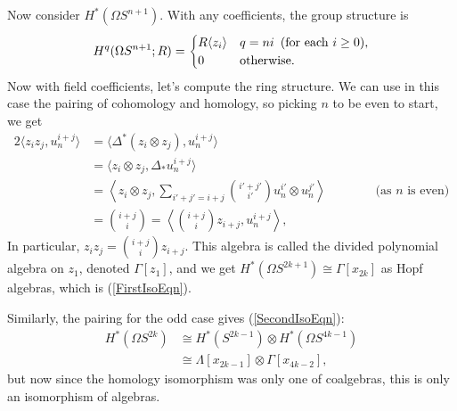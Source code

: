 \documentclass{article}
\newcommand{\Loops}{\Omega}
\begin{document}
Now consider $H^* (\Loops S^{n+1})$.  With any coefficients, the group structure is
\[
H^q(\Loops S^{n+1}; R) = \begin{cases} R \langle z_i \rangle & q=ni\textup{ \,(for each $i\geq0$)}, \\ 0 & \mathrm{otherwise}. \end{cases}
\]
Now with field coefficients, let's compute the ring structure.  We can use in this case the pairing of cohomology and homology, so picking $n$ to be even to start, we get
\begin{alignat*}{2}
\langle z_i z_j, u_n^{i+j} \rangle & = \langle \Delta^*(z_i \otimes z_j), u_n^{i+j} \rangle&\qquad& \\
& = \langle z_i \otimes z_j, \Delta_* u_n^{i+j} \rangle \\
& = \left\langle z_i \otimes z_j, \sum_{i'+j'=i+j} {\textstyle\binom{i'+j'}{i'}} u_n^{i'} \otimes u_n^{j'} \right\rangle&&\text{\ (as $n$ is even)} \\
& = {\textstyle\binom{i+j}{i}} = \left\langle {\textstyle\binom{i+j}{i}} z_{i+j}, u_n^{i+j} \right\rangle,
\end{alignat*}
In particular, $z_i z_j = \binom{i+j}{i} z_{i+j}$. This algebra is called the divided polynomial algebra on $z_1$, denoted $\Gamma[z_1]$, and we get $H^* (\Loops S^{2k+1}) \cong \Gamma[x_{2k}]$ as Hopf algebras, which is (\ref{FirstIsoEqn}).

Similarly, the pairing for the odd case gives (\ref{SecondIsoEqn}):
\begin{align*}
H^* (\Loops S^{2k}) & \cong H^* (S^{2k-1}) \otimes H^* (\Loops S^{4k-1}) \\
& \cong \Lambda[x_{2k-1}] \otimes \Gamma[x_{4k-2}],
\end{align*}
but now since the homology isomorphism was only one of coalgebras, this is only an isomorphism of algebras.
\end{document}
